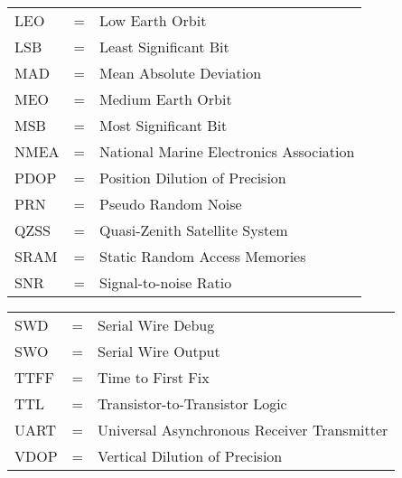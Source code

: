 \begin{tabular}{llp{3in}}
	LEO &  \hspace{1.5cm} = & Low Earth Orbit\\
	LSB &  \hspace{1.5cm} = & Least Significant Bit \\
	MAD &  \hspace{1.5cm} = & Mean Absolute Deviation \\
	MEO &  \hspace{1.5cm} = & Medium Earth Orbit\\
	MSB &  \hspace{1.5cm} = & Most Significant Bit \\
	NMEA &  \hspace{1.5cm} = & National Marine Electronics Association\\
	PDOP &  \hspace{1.5cm} = & Position Dilution of Precision \\
	PRN &  \hspace{1.5cm} = & Pseudo Random Noise\\
	QZSS &  \hspace{1.5cm} = & Quasi-Zenith Satellite System\\
	SRAM &  \hspace{1.5cm} = & Static Random Access Memories \\
	SNR &  \hspace{1.5cm} = & Signal-to-noise Ratio\\
\end{tabular}
\newpage
\begin{tabular}{llp{3in}}
	SWD &  \hspace{1.5cm} = & Serial Wire Debug \\
	SWO &  \hspace{1.5cm} = & Serial Wire Output \\
	TTFF &  \hspace{1.5cm} = & Time to First Fix \\
	TTL &  \hspace{1.5cm} = & Transistor-to-Transistor Logic\\
	UART &  \hspace{1.5cm} = & Universal Asynchronous Receiver Transmitter \\
	VDOP &  \hspace{1.5cm} = & Vertical Dilution of Precision \\
\end{tabular}
